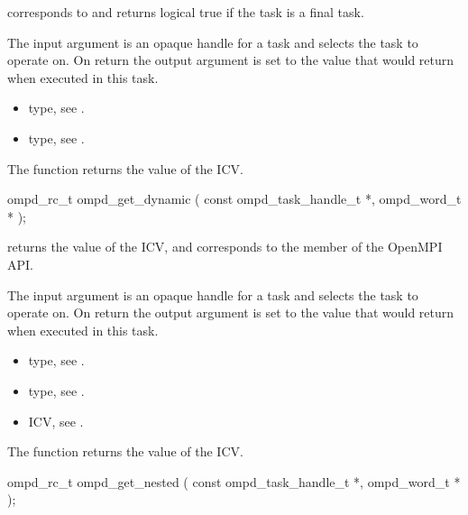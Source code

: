 \descr
{} corresponds to  and returns
logical true if the task is a final task.

\argdesc
The input argument  is an opaque handle for a task and selects the task to operate on.
On return the output argument  is set to the value that  would return when
executed in this task.

\crossreferences
\begin{itemize}
	\item {} type, see .
	\item {} type, see .
\end{itemize}


\label{ompd:ompd_get_dynamic}
\summary
The  function returns the value of the  ICV.

\format
\cspecificstart
\begin{boxedcode}
ompd\_rc\_t ompd\_get\_dynamic (
  const ompd\_task\_handle\_t  *, 
  ompd\_word\_t   * 
);
\end{boxedcode}
\cspecificend

\descr
{} returns the value of the
 ICV,
and corresponds to the  member of the OpenMPI API.

\argdesc
The input argument  is an opaque handle for a task and selects the task to operate on.
On return the output argument  is set to the value that  would return when
executed in this task.

\crossreferences
\begin{itemize}
	\item {} type, see .
	\item {} type, see .
	\item {} ICV, see .
\end{itemize}


\label{ompd:ompd_get_nested}
\summary
The  function returns the value of the  ICV.

\format
\cspecificstart
\begin{boxedcode}
ompd\_rc\_t ompd\_get\_nested (
  const ompd\_task\_handle\_t  *, 
  ompd\_word\_t              *
);
\end{boxedcode}
\cspecificend

